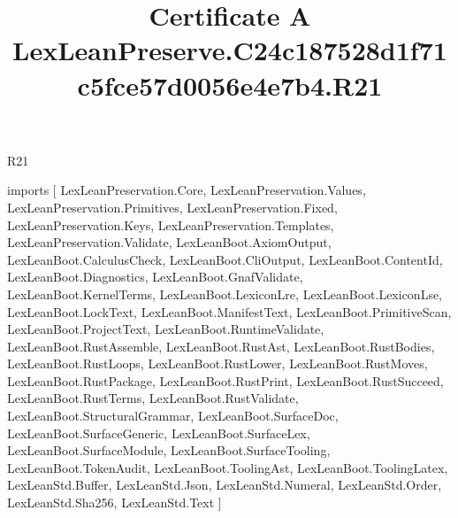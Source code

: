 \begin{lexlean}{R21}
\title{Certificate A LexLeanPreserve.C24c187528d1f71c5fce57d0056e4e7b4.R21}
\begin{coremodule}
imports [
  LexLeanPreservation.Core,
  LexLeanPreservation.Values,
  LexLeanPreservation.Primitives,
  LexLeanPreservation.Fixed,
  LexLeanPreservation.Keys,
  LexLeanPreservation.Templates,
  LexLeanPreservation.Validate,
  LexLeanBoot.AxiomOutput,
  LexLeanBoot.CalculusCheck,
  LexLeanBoot.CliOutput,
  LexLeanBoot.ContentId,
  LexLeanBoot.Diagnostics,
  LexLeanBoot.GnafValidate,
  LexLeanBoot.KernelTerms,
  LexLeanBoot.LexiconLre,
  LexLeanBoot.LexiconLse,
  LexLeanBoot.LockText,
  LexLeanBoot.ManifestText,
  LexLeanBoot.PrimitiveScan,
  LexLeanBoot.ProjectText,
  LexLeanBoot.RuntimeValidate,
  LexLeanBoot.RustAssemble,
  LexLeanBoot.RustAst,
  LexLeanBoot.RustBodies,
  LexLeanBoot.RustLoops,
  LexLeanBoot.RustLower,
  LexLeanBoot.RustMoves,
  LexLeanBoot.RustPackage,
  LexLeanBoot.RustPrint,
  LexLeanBoot.RustSucceed,
  LexLeanBoot.RustTerms,
  LexLeanBoot.RustValidate,
  LexLeanBoot.StructuralGrammar,
  LexLeanBoot.SurfaceDoc,
  LexLeanBoot.SurfaceGeneric,
  LexLeanBoot.SurfaceLex,
  LexLeanBoot.SurfaceModule,
  LexLeanBoot.SurfaceTooling,
  LexLeanBoot.TokenAudit,
  LexLeanBoot.ToolingAst,
  LexLeanBoot.ToolingLatex,
  LexLeanStd.Buffer,
  LexLeanStd.Json,
  LexLeanStd.Numeral,
  LexLeanStd.Order,
  LexLeanStd.Sha256,
  LexLeanStd.Text
]


\end{coremodule}
\end{lexlean}
